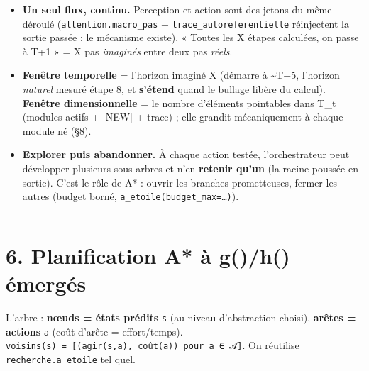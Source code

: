 \documentclass[
  french,
  11pt,
]{article}
\providecommand{\tightlist}{%
  \setlength{\itemsep}{0pt}\setlength{\parskip}{0pt}}
\begin{document}
\begin{itemize}
\tightlist
\item
  \textbf{Un seul flux, continu.} Perception et action sont des jetons
  du même déroulé (\texttt{attention.macro\_pas} +
  \texttt{trace\_autoreferentielle} réinjectent la sortie passée : le
  mécanisme existe). « Toutes les X étapes calculées, on passe à T+1 » =
  X pas \emph{imaginés} entre deux pas \emph{réels}.
\item
  \textbf{Fenêtre temporelle} = l'horizon imaginé X (démarre à
  \textasciitilde T+5, l'horizon \emph{naturel} mesuré étape 8, et
  \textbf{s'étend} quand le bullage libère du calcul). \textbf{Fenêtre
  dimensionnelle} = le nombre d'éléments pointables dans T\_t (modules
  actifs + {[}NEW{]} + trace) ; elle grandit mécaniquement à chaque
  module né (§8).
\item
  \textbf{Explorer puis abandonner.} À chaque action testée,
  l'orchestrateur peut développer plusieurs sous-arbres et n'en
  \textbf{retenir qu'un} (la racine poussée en sortie). C'est le rôle de
  A* : ouvrir les branches prometteuses, fermer les autres (budget
  borné, \texttt{a\_etoile(budget\_max=…)}).
\end{itemize}

\begin{center}\rule{0.5\linewidth}{0.5pt}\end{center}

\section{6. Planification A* à g()/h()
émergés}\label{planification-a-uxe0-gh-uxe9merguxe9s}

L'arbre : \textbf{nœuds = états prédits} \texttt{s} (au niveau
d'abstraction choisi), \textbf{arêtes = actions} \texttt{a} (coût
d'arête = effort/temps).
\texttt{voisins(s)\ =\ {[}(agir(s,a),\ coût(a))\ pour\ a\ ∈\ 𝒜{]}}. On
réutilise \texttt{recherche.a\_etoile} tel quel.
\end{document}
